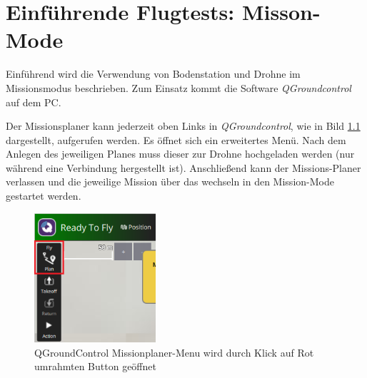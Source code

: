 \chapter{Einführende Flugtests: Misson-Mode}
Einführend wird die Verwendung von Bodenstation und Drohne im Missionsmodus beschrieben. Zum Einsatz kommt die Software \textit{QGroundcontrol} auf dem PC. 

\begin{multicols}{2}
    Der Missionsplaner kann jederzeit oben Links in \textit{QGroundcontrol}, wie in Bild \ref{fig:qgc_mission_plan} dargestellt, aufgerufen werden. Es öffnet sich ein erweitertes Menü. Nach dem Anlegen des jeweiligen Planes muss dieser zur Drohne hochgeladen werden (nur während eine Verbindung hergestellt ist). Anschließend kann der Missions-Planer verlassen und die jeweilige Mission über das wechseln in den Mission-Mode gestartet werden.
    \vfill\null
    \columnbreak
    \begin{figure}[H]
        \centering
        \includegraphics[width=0.4\textwidth]{images/mission_plan_open.png}
        \caption[QGroundControl Missionplaner-Menu]{QGroundControl Missionplaner-Menu wird durch Klick auf Rot umrahmten Button geöffnet}
        \label{fig:qgc_mission_plan}
    \end{figure}
\end{multicols}

\newpage
